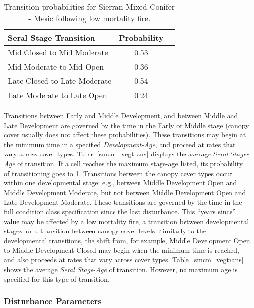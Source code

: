 \begin{table}[!htbp]
\small
\centering
\caption{Transition probabilities for Sierran Mixed Conifer - Mesic following low mortality fire.}
\label{smcm_firetrans}
\begin{tabular}{lcc}
\hline
\textbf{Seral Stage Transition} & \textbf{Probability}\\
\hline
Mid Closed to Mid Moderate     	& 0.53   	\\
Mid Moderate to Mid Open    	& 0.36		\\
Late Closed to Late Moderate	& 0.54    \\
Late Moderate to Late Open     	& 0.24    \\
\hline
\end{tabular}
\end{table}

Transitions between Early and Middle Development, and between Middle and Late Development are governed by the time in the Early or Middle stage (canopy cover usually does not affect these probabilities). These transitions may begin at the minimum time in a specified \emph{Development-Age}, and proceed at rates that vary across cover types. Table~\ref{smcm_vegtrans} displays the average \emph{Seral Stage-Age} of transition. If a cell reaches the maximum stage-age listed, its probability of transitioning goes to 1. Transitions between the canopy cover types occur within one developmental stage: e.g., between Middle Development Open and Middle Development Moderate, but not between Middle Development Open and Late Development Moderate. These transitions are governed by the time in the full condition class specification since the last disturbance. This ``years since'' value may be affected by a low mortality fire, a transition between developmental stages, or a transition between canopy cover levels. Similarly to the developmental transitions, the shift from, for example, Middle Development Open to Middle Development Closed may begin when the minimum time is reached, and also proceeds at rates that vary across cover types. Table~\ref{smcm_vegtrans} shows the average \emph{Seral Stage-Age} of transition. However, no maximum age is specified for this type of transition.

\subsubsection{Disturbance Parameters} 
\label{subsubsec:distparams}

